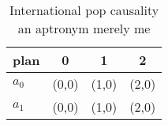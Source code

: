 \documentclass[a4paper]{article}
\begin{document}
\begin{table}
\begin{adjustbox}{width=0.6\columnwidth}
\begin{tabular}{|l|l|l|l|}
\hline
\textbf{plan} & \multicolumn{1}{c|}{\textbf{0}} & \multicolumn{1}{c|}{\textbf{1}} & \multicolumn{1}{c|}{\textbf{2}} \\ \hline
\textbf{$a_0$}  & (0,0) & (1,0) & (2,0) \\ \hline
\textbf{$a_1$}  & (0,0) & (1,0) & (2,0) \\ \hline
\end{tabular}
\end{adjustbox}
\caption{International pop causality an aptronym merely me
}
\end{table}
\end{document}
